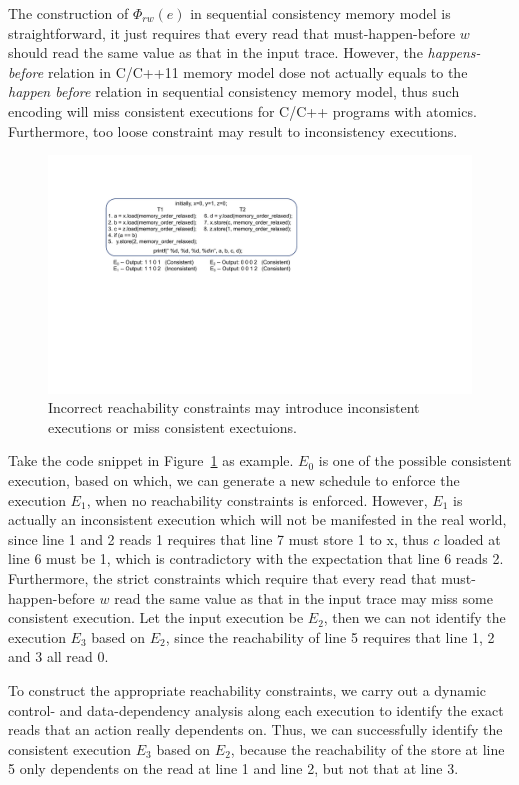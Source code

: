 \documentclass[preprint, numbers, 10pt]{sigplanconf}
\begin{document}
The construction of $\Phi_{rw}(e)$ in sequential consistency memory model is straightforward,
it just requires that every read that must-happen-before $w$ should read 
the same value as that in the input trace. However, the \textit{happens-before} relation
in C/C++11 memory model dose not actually equals to the \textit{happen before} relation in sequential 
consistency memory model, thus such encoding will miss consistent executions for C/C++ programs with atomics. 
Furthermore, too loose constraint may result to inconsistency executions. 

\begin{figure}%
\centering\includegraphics[scale=0.5]{inconsistency.pdf} %
\caption{Incorrect reachability constraints may introduce inconsistent executions or
miss consistent exectuions.}
\label{fig:inconsistency}
\end{figure}

Take the code snippet in Figure~\ref{fig:inconsistency} as example. 
$E_0$ is one of the possible consistent execution, based on which, 
we can generate a new schedule to enforce the execution $E_1$, 
when no reachability constraints is enforced. 
However, $E_1$ is actually an inconsistent execution which 
will not be manifested in the real world, 
since line 1 and 2 reads 1 requires that line 7 must store 1 to x,
thus $c$ loaded at line 6 must be 1, which is contradictory with the expectation that line 6 reads 2. 
Furthermore, the strict constraints which require that every read that must-happen-before 
$w$ read the same value as that in the input trace may miss some consistent execution. 
Let the input execution be $E_2$, then we can not identify the execution $E_3$ based on $E_2$,
since the reachability of line 5 requires that line 1, 2 and 3 all read 0.

To construct the appropriate reachability constraints, we carry out a dynamic control- and 
data-dependency analysis along each execution to identify the exact reads that an action 
really dependents on. Thus, we can successfully
identify the consistent execution $E_3$ based on $E_2$, because the reachability of the store at
line 5 only dependents on the read at line 1 and line 2, but not that at line 3.
\end{document}

